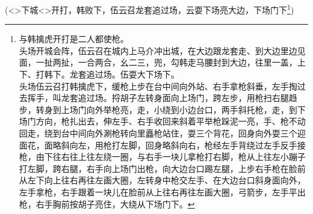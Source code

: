 {






(\textless{}\!\textgreater{}{\hwfs 下城}\textless{}\!\textgreater{}{\hwfs 开打}，韩{\hwfs 败下}，伍云召{\hwfs 龙套追过场}，云{\hwfs 耍下场亮大边}，{\hwfs 下场门下}\footnote{{\hei 与韩擒虎开打是二人都使枪}。\\{\hwfs 头场开城会阵}，伍云召{\hwfs 在城内上马介冲出城}，{\hwfs 在大边跟龙套走}、{\hwfs 到大边里边见面}，{\hwfs 一扯两扯}，{\hwfs 一合两合}，{\hwfs 幺二三}，{\hwfs 兜}，{\hwfs 勾}韩{\hwfs 走马腰封到大边}，{\hwfs 往里一盖}，{\hwfs 上下}、{\hwfs 打}韩{\hwfs 下}。龙套{\hwfs 追过场}。伍{\hwfs 耍大下场下}。\\{\hwfs 头场}伍云召{\hwfs 打}韩擒虎{\hwfs 下}，{\hwfs 缓枪上步在台中间向外站}、{\hwfs 右手拿枪斜垂}，{\hwfs 左手掏过去挥手}，{\hwfs 叫}龙套{\hwfs 追过场}。{\hwfs 捋胡子左转身面向上场门}，{\hwfs 跨左步}，{\hwfs 用枪扫右腿趋步}，{\hwfs 转身到上场门向外举枪亮}，{\hwfs 走}，{\hwfs 小绕到小边台口}，{\hwfs 两手斜托枪}，{\hwfs 走}，{\hwfs 到下场门方向}，{\hwfs 枪扎出去}，{\hwfs 伸左手}、{\hwfs 右手收回来斜着平举枪跺泥一亮}，{\hwfs 手}、{\hwfs 枪不动回走}，{\hwfs 绕到台中间向外涮枪转向里矗枪站住}，{\hwfs 耍三个背花}，{\hwfs 回身向外耍三个迎面花}，{\hwfs 面略斜向左}，{\hwfs 用枪打左脚}，{\hwfs 回身略斜向右}，{\hwfs 枪经左手背绕过左手反手接枪}，{\hwfs 由下往右往上往左绕一圈}，{\hwfs 与右手一块儿拿枪打右脚}，{\hwfs 枪从上往左小蹦子打左脚}，{\hwfs 跨右腿}，{\hwfs 右手向上场门出枪}，{\hwfs 向大边台口踢左腿}，{\hwfs 上步右手枪在脸前从左下向上往右再往左画大圈}，{\hwfs 左转身中枪交左手}、{\hwfs 在大边台口斜身面向外}，{\hwfs 左手拿枪}，{\hwfs 右手跟着一块儿在脸前从上往右再往左画大圈}，{\hwfs 弓箭步}，{\hwfs 左手平出枪}，{\hwfs 右手胸前按胡子亮住}，{\hwfs 大绕从下场门下。}})

}
